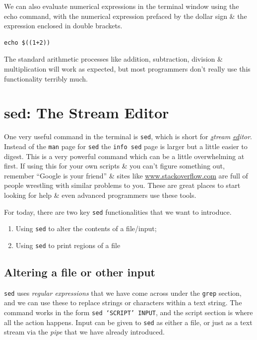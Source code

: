 \documentclass[a4paper,12pt,twoside]{memoir}
\begin{document}
\begin{steps}
We can also evaluate numerical expressions in the terminal window using the echo command, with the numerical expression prefaced by the dollar sign \& the expression enclosed in double brackets. \\
\begin{lstlisting}
echo $((1+2))
\end{lstlisting}
The standard arithmetic processes like addition, subtraction, division \& multiplication will work as expected, but most programmers don't really use this functionality terribly much.
\end{steps}

\section{sed: The Stream Editor}
\begin{information}
One very useful command in the terminal is \texttt{sed}, which is short for \textit{\underline{s}tream \underline{ed}itor}.
Instead of the \texttt{man} page for \texttt{sed} the \texttt{info sed} page is larger but a little easier to digest.
This is a very powerful command which can be a little overwhelming at first.
If using this for your own scripts \& you can't figure something out, remember ``Google is your friend'' \& sites like \url{www.stackoverflow.com} are full of people wrestling with similar problems to you.
These are great places to start looking for help \& even advanced programmers use these tools. \\
\end{information}

For today, there are two key \texttt{sed} functionalities that we want to introduce.\\
\begin{enumerate}
\item Using \texttt{sed} to alter the contents of a file/input;
\item Using \texttt{sed} to print regions of a file
\end{enumerate}

\subsection*{Altering a file or other input}
\texttt{sed} uses \textit{regular expressions} that we have come across under the \texttt{grep} section, and we can use these to replace strings or characters within a text string.
The command works in the form \texttt{sed `SCRIPT' INPUT}, and the script section is where all the action happens.
Input can be given to \texttt{sed} as either a file, or just as a text stream via the \textit{pipe} that we have already introduced.
\end{document}
